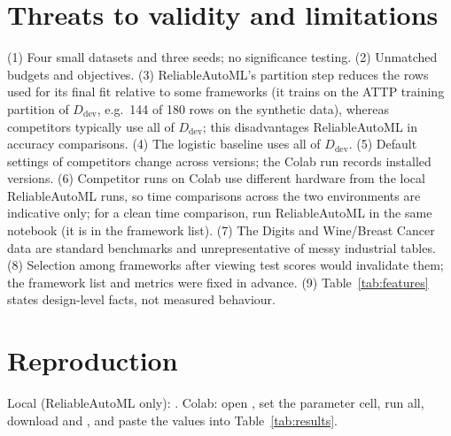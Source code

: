 \documentclass[conference]{IEEEtran}
\begin{document}
\section{Threats to validity and limitations}
(1) Four small datasets and three seeds; no significance testing. (2) Unmatched budgets and objectives. (3) ReliableAutoML's partition step reduces the rows used for its final fit relative to some frameworks (it trains on the ATTP training partition of $D_{\mathrm{dev}}$, e.g.\ 144 of 180 rows on the synthetic data), whereas competitors typically use all of $D_{\mathrm{dev}}$; this disadvantages ReliableAutoML in accuracy comparisons. (4) The logistic baseline uses all of $D_{\mathrm{dev}}$. (5) Default settings of competitors change across versions; the Colab run records installed versions. (6) Competitor runs on Colab use different hardware from the local ReliableAutoML runs, so time comparisons across the two environments are indicative only; for a clean time comparison, run ReliableAutoML in the same notebook (it is in the framework list). (7) The Digits and Wine/Breast Cancer data are standard benchmarks and unrepresentative of messy industrial tables. (8) Selection among frameworks after viewing test scores would invalidate them; the framework list and metrics were fixed in advance. (9) Table~\ref{tab:features} states design-level facts, not measured behaviour.

\section{Reproduction}
Local (ReliableAutoML only): . Colab: open , set the parameter cell, run all, download  and , and paste the values into Table~\ref{tab:results}.
\end{document}
